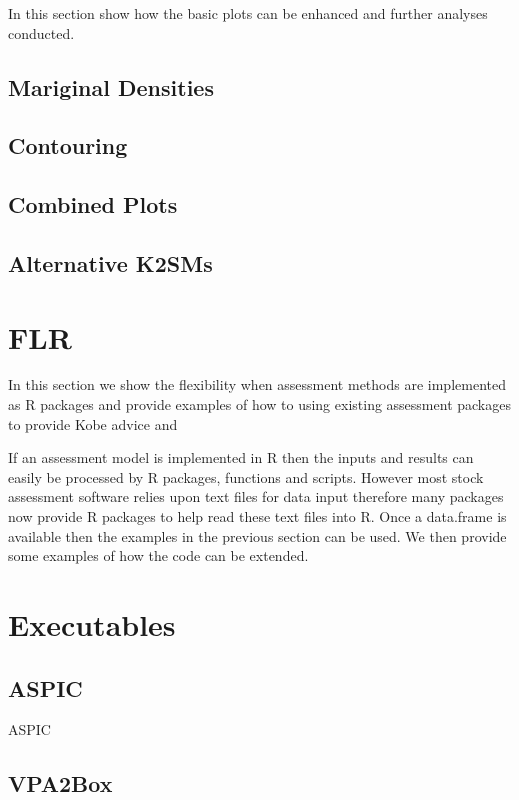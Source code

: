 \documentclass[a4paper, 11pt, oldtoc]{artikel1}
\begin{document}
In this section show how the basic plots can be enhanced and further analyses conducted.

\subsection*{Mariginal Densities}


\subsection*{Contouring}

\subsection*{Combined Plots}

\subsection*{Alternative K2SMs}

\section*{FLR}

In this section we show the flexibility when assessment methods are implemented as R packages and provide examples of how to using existing assessment packages 
to provide Kobe advice and 

If an assessment model is implemented in R then the inputs and results can easily be processed by R packages, functions and scripts. However most stock assessment 
software relies upon text files for data input therefore many packages now provide R packages to help read these text files into R. Once a data.frame is
available then the examples in the previous section can be used. We then provide some examples of how the code can be extended. 

\section*{Executables}

\subsection*{ASPIC}

ASPIC

\subsection*{VPA2Box}
\end{document}
